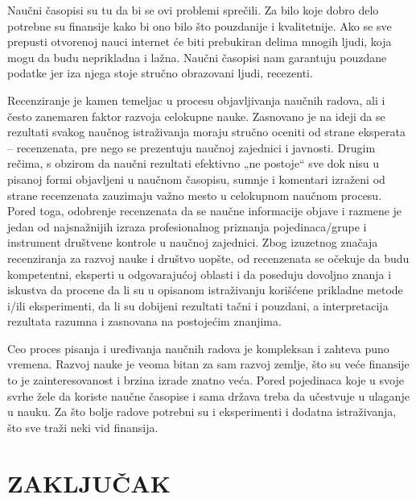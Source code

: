 \documentclass[12pt,a4paper]{article}
\begin{document}
    \qquad
     Naučni časopisi su tu da bi se ovi problemi sprečili. Za bilo koje dobro delo potrebne su finansije kako bi ono bilo što pouzdanije i kvalitetnije. Ako se sve prepusti otvorenoj nauci internet će biti prebukiran delima mnogih ljudi, koja mogu da budu neprikladna i lažna. Naučni časopisi nam garantuju pouzdane podatke jer iza njega stoje stručno obrazovani ljudi, recezenti.
     
   Recenziranje je kamen temeljac u procesu objavljivanja naučnih radova, ali i često zanemaren faktor razvoja celokupne nauke. Zasnovano je na ideji da se rezultati svakog naučnog istraživanja moraju stručno oceniti od strane eksperata – recenzenata, pre nego se prezentuju naučnoj zajednici i javnosti. Drugim rečima, s obzirom da naučni rezultati efektivno „ne postoje“ sve dok nisu u pisanoj formi objavljeni u naučnom časopisu, sumnje i komentari izraženi od strane recenzenata zauzimaju važno mesto u celokupnom naučnom procesu. Pored toga, odobrenje recenzenata da se naučne informacije objave i razmene je jedan od najsnažnijih izraza profesionalnog priznanja pojedinaca/grupe i instrument društvene kontrole u naučnoj zajednici. Zbog izuzetnog značaja recenziranja za razvoj nauke i društvo uopšte, od recenzenata se očekuje da budu kompetentni, eksperti u odgovarajućoj oblasti i da poseduju dovoljno znanja i iskustva da procene da li su u opisanom istraživanju korišćene prikladne metode i/ili eksperimenti, da li su dobijeni rezultati tačni i pouzdani, a interpretacija rezultata razumna i zasnovana na postojećim znanjima.  
  
   Ceo proces pisanja i uređivanja naučnih radova je kompleksan i zahteva puno vremena. Razvoj nauke je veoma bitan za sam razvoj zemlje, što su veće finansije to je zainteresovanost i brzina izrade znatno veća. Pored pojedinaca koje u svoje svrhe žele da koriste naučne časopise i sama država treba da učestvuje u ulaganje u nauku. Za što bolje radove potrebni su i eksperimenti i dodatna istraživanja, što sve traži neki vid finansija. 


   
\section{\large\textbf{ZAKLJUČAK}}
\indent
\end{document}
